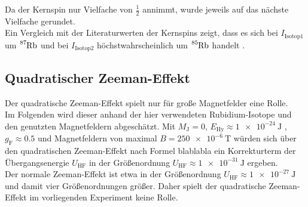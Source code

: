 Da der Kernspin nur Vielfache von $\frac{1}{2}$ annimmt, wurde jeweils auf das nächste Vielfache gerundet.\\
Ein Vergleich mit der Literaturwerten der Kernspins zeigt, dass es sich bei $I_{\mathrm{Isotop 1}}$ um $\ce{^87Rb}$ und bei $I_{\mathrm{Isotop 2}}$ höchstwahrscheinlich um $\ce{^85Rb}$ handelt \cite{muenster}.

\subsection{Quadratischer Zeeman-Effekt}
Der quadratische Zeeman-Effekt spielt nur für große Magnetfelder eine Rolle. \\
Im Folgenden wird dieser anhand der hier verwendeten Rubidium-Isotope und den genutzten Magnetfeldern abgeschätzt.
Mit $M_{\mathrm{J}}=0$, \Delta$E_{\mathrm{Hy}}\approx\SI{1e-24}{\joule}$ \cite{Anleitung}, $g_{\mathrm{F}}\approx 0.5$ und Magnetfeldern von maximal $B=\SI{250e-6}{\tesla}$ würden sich über den quadratischen Zeeman-Effekt nach Formel blablabla ein Korrekturterm der Übergangsenergie $U_{\mathrm{HF}}$ in der Größenordnung $U_{\mathrm{HF}}\approx \SI{1e-31}{\joule}$ ergeben.\\
Der normale Zeeman-Effekt ist etwa in der Größenordnung $U_{\mathrm{HF}}\approx \SI{1e-27}{\joule}$ und damit vier Größenordnungen größer. Daher spielt der quadratische Zeeman-Effekt im vorliegenden Experiment keine Rolle.
